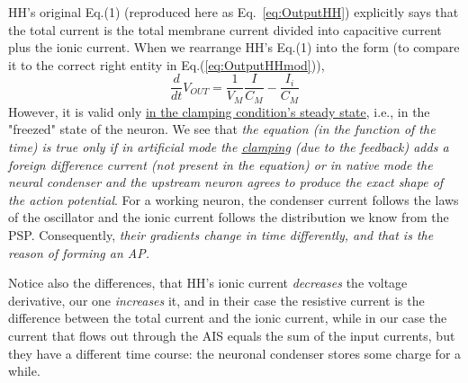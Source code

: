  HH's original Eq.(1) (reproduced here as Eq.~\ref{eq:OutputHH})
explicitly says that the total current is
the total membrane current divided into capacitive current plus the ionic current.
When we rearrange HH's Eq.(1) into the form
(to compare it to the correct right entity in Eq.(\ref{eq:OutputHHmod})),
\begin{equation}
	\frac{d}{dt}V_{OUT}= \frac{1}{V_M}\frac{I}{C_M} - \frac{I_i}{C_M} \label{eq:OutputHHmod}
\end{equation}
However, it is valid only \hyperlink{voltage-clamping}{in
the clamping condition's steady state}, i.e., in the "freezed" state of the neuron.
We see that \textit{the equation (in the function of the time) is true only
if in artificial mode the \hyperlink{voltage-clamping}{clamping} (due to the feedback)
adds a foreign difference current (not present in the equation)
or in native mode the neural condenser and the upstream neuron agrees to produce the exact shape of the action potential}. For a working neuron, 
the condenser current follows the laws of the oscillator and the ionic current follows the distribution we know from the 
\gls{PSP}. 
Consequently, \textit{their gradients change in time differently, and that is the reason of forming an 
\gls{AP}.
}


Notice also the differences, that HH's ionic current \textit{decreases} the voltage derivative, our one
\textit{increases} it, and in their  case the resistive current is the difference between the total current
and the ionic current, while in our case the current that flows out through the 
\gls{AIS}
equals the sum of the input currents, but they have 
a different time course: the neuronal condenser stores
some charge for a while.


